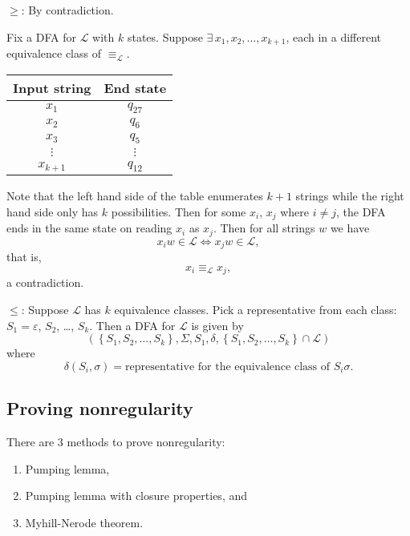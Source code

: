 \documentclass{notes}
\begin{document}
\begin{prf}
  $\geq$: By contradiction.

  Fix a DFA for $\mathcal L$ with $k$ states.
  Suppose $\exists \, x_1, x_2, \dots, x_{k + 1}$, each in a different equivalence class of $\equiv_\mathcal L$.
  
  \begin{center}
    \begin{tabular}{cc}
      Input string & End state \\ 
      \hline
      $x_1$ & $q_{27}$ \\ 
      $x_2$ & $q_6$ \\ 
      $x_3$ & $q_5$ \\ 
      $\vdots$ & $\vdots$ \\ 
      $x_{k + 1}$ & $q_{12}$
    \end{tabular}
  \end{center}
  
  Note that the left hand side of the table enumerates $k + 1$ strings while the right hand side only has $k$ possibilities.
  Then for some $x_i$, $x_j$ where $i \neq j$, the DFA ends in the same state on reading $x_i$ as $x_j$.
  Then for all strings $w$ we have 
  \[
    x_i w \in \mathcal L \Leftrightarrow x_j w \in \mathcal L, 
  \]
  that is, 
  \[
    x_i \equiv_\mathcal L x_j, 
  \]
  a contradiction.
  
  $\leq$: Suppose $\mathcal L$ has $k$ equivalence classes.
  Pick a representative from each class: $S_1 = \varepsilon$, $S_2$, \dots, $S_k$.
  Then a DFA for $\mathcal L$ is given by 
  \[
    (\left \{ S_1, S_2, \dots, S_k \right \}, \Sigma, S_1, \delta, \left \{ S_1, S_2, \dots, S_k \right \} \cap \mathcal L)
  \]
  where 
  \[
    \delta(S_i, \sigma) = \text{representative for the equivalence class of $S_i \sigma$}.
  \]
\end{prf}

\newpage

\subsection{Proving nonregularity}

There are 3 methods to prove nonregularity: 

\begin{enumerate}
  \item Pumping lemma, 
  
  \item Pumping lemma with closure properties, and 

  \item Myhill-Nerode theorem.
\end{enumerate}
\end{document}
